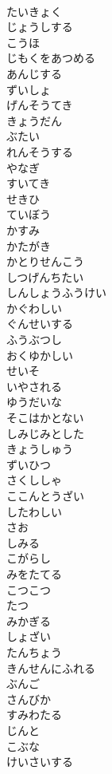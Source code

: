 \documentclass[8pt]{extreport}
\begin{document}
\begin{CJK}{UTF8}{min}
\\	たいきょく
\\	じょうしする
\\	こうほ
\\	じもくをあつめる
\\	あんじする
\\	ずいしょ
\\	げんそうてき
\\	きょうだん
\\	ぶたい
\\	れんそうする
\\	やなぎ
\\	すいてき
\\	せきひ
\\	ていぼう
\\	かすみ
\\	かたがき
\\	かとりせんこう
\\	しつげんちたい
\\	しんしょうふうけい
\\	かぐわしい
\\	ぐんせいする
\\	ふうぶつし
\\	おくゆかしい
\\	せいそ
\\	いやされる
\\	ゆうだいな
\\	そこはかとない
\\	しみじみとした
\\	きょうしゅう
\\	ずいひつ
\\	さくししゃ
\\	ここんとうざい
\\	したわしい
\\	さお
\\	しみる
\\	こがらし
\\	みをたてる
\\	こつこつ
\\	たつ
\\	みかぎる
\\	しょざい
\\	たんちょう
\\	きんせんにふれる
\\	ぶんご
\\	さんびか
\\	すみわたる
\\	じんと
\\	こぶな
\\	けいさいする

\end{CJK}
\end{document}
